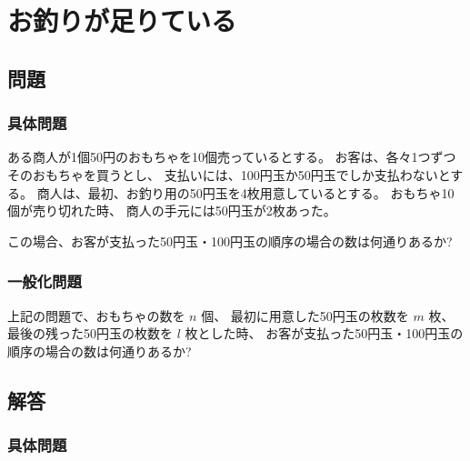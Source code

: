 \section{お釣りが足りている}
\label{s:お釣り}

\subsection{問題}
\label{ssec:お釣り:問題}

\subsubsection{具体問題}
\label{sssec:お釣り:問題:具体問題}

ある商人が1個50円のおもちゃを10個売っているとする。
お客は、各々1つずつそのおもちゃを買うとし、
支払いには、100円玉か50円玉でしか支払わないとする。
商人は、最初、お釣り用の50円玉を4枚用意しているとする。
おもちゃ10個が売り切れた時、
商人の手元には50円玉が2枚あった。

この場合、お客が支払った50円玉・100円玉の順序の場合の数は何通りあるか?

\subsubsection{一般化問題}
\label{sssec:お釣り:問題:一般化問題}

上記の問題で、おもちゃの数を $n$ 個、
最初に用意した50円玉の枚数を $m$ 枚、
最後の残った50円玉の枚数を $l$ 枚とした時、
お客が支払った50円玉・100円玉の順序の場合の数は何通りあるか?


\clearpage
\subsection{解答}
\label{ssec:お釣り:解答}

\subsubsection{具体問題}
\label{sssec:お釣り:解答:具体問題}


